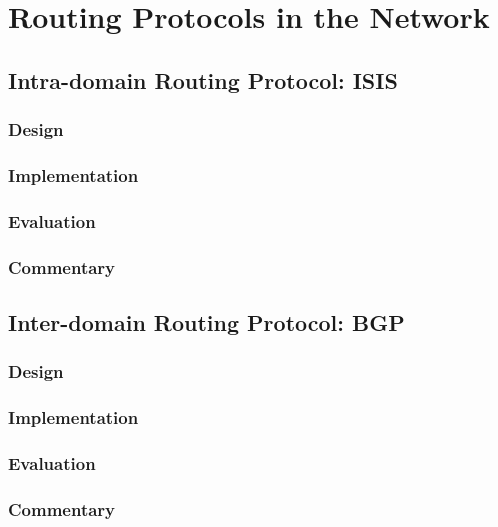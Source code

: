 \chapter{Routing Protocols in the Network}
\label{chap:routing}

\section{Intra-domain Routing Protocol: ISIS}

\subsection{Design}

\subsection{Implementation}

\subsection{Evaluation}

\subsection{Commentary}



\section{Inter-domain Routing Protocol: BGP}

\subsection{Design}

\subsection{Implementation}

\subsection{Evaluation}

\subsection{Commentary}

